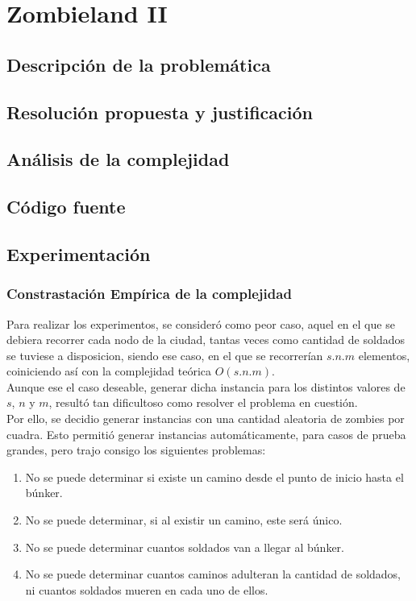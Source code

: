 \section{Zombieland II}
\subsection{Descripci\'on de la problem\'atica}
\subsection{Resoluci\'on propuesta y justificaci\'on}
\subsection{An\'alisis de la complejidad}
\subsection{C\'odigo fuente}
\subsection{Experimentaci\'on}
\subsubsection{Constrastaci\'on Emp\'irica de la complejidad}
Para realizar los experimentos, se consideró como peor caso, aquel en el que se debiera recorrer cada nodo de la ciudad, tantas veces como cantidad de soldados se tuviese a disposicion, siendo ese caso, en el que se recorrerían $s.n.m$ elementos, coiniciendo así con la complejidad teórica $O(s.n.m)$.\\
Aunque ese el caso deseable, generar dicha instancia para los distintos valores de $s$, $n$ y $m$, resultó tan dificultoso como resolver el problema en cuestión.\\
Por ello, se decidio generar instancias con una cantidad aleatoria de zombies por cuadra. Esto permitió generar instancias automáticamente, para casos de prueba grandes, pero trajo consigo los siguientes problemas:
\begin{enumerate}
	\item No se puede determinar si existe un camino desde el punto de inicio hasta el búnker.
	\item No se puede determinar, si al existir un camino, este será único.
	\item No se puede determinar cuantos soldados van a llegar al búnker.
	\item No se puede determinar cuantos caminos adulteran la cantidad de soldados, ni cuantos soldados mueren en cada uno de ellos.
\end{enumerate}


